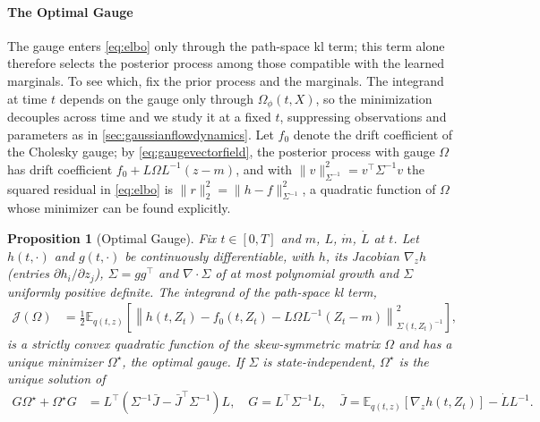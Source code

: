\documentclass{article} %
\newcommand{\priordrift}{h}
\newcommand{\postdrift}{f}
\newcommand{\vol}{g}
\newcommand{\obs}{X}
\newcommand{\gauge}{\Omega}
\newcommand{\E}{\mathbb{E}}
\newtheorem{proposition}[theorem]{Proposition}
\begin{document}
\paragraph{The Optimal Gauge}
The gauge enters \cref{eq:elbo} only through the path-space \gls{kl} term; this term alone therefore selects the posterior process among those compatible with the learned marginals. To see which, fix the prior process and the marginals. The integrand at time $t$ depends on the gauge only through $\gauge_\phi(t, \obs)$, so the minimization decouples across time and we study it at a fixed $t$, suppressing observations and parameters as in \cref{sec:gaussianflowdynamics}. Let $\postdrift_0$ denote the drift coefficient of the Cholesky gauge; by \cref{eq:gaugevectorfield}, the posterior process with gauge $\gauge$ has drift coefficient $\postdrift_0 + L \gauge L^{-1}(z - m)$, and with $\| v \|_{\Sigma^{-1}}^2 = v^\top \Sigma^{-1} v$ the squared residual in \cref{eq:elbo} is $\| r \|_2^2 = \| \priordrift - \postdrift \|_{\Sigma^{-1}}^2$, a quadratic function of $\gauge$ whose minimizer can be found explicitly.
\begin{proposition}[Optimal Gauge]
\label{prop:optimalgauge}
Fix $t \in [0, T]$ and $m$, $L$, $\dot m$, $\dot L$ at $t$. Let $\priordrift(t, \cdot)$ and $\vol(t, \cdot)$ be continuously differentiable, with $\priordrift$, its Jacobian $\nabla_z \priordrift$ (entries $\partial \priordrift_i / \partial z_j$), $\Sigma = \vol \vol^\top$ and $\nabla \cdot \Sigma$ of at most polynomial growth and $\Sigma$ uniformly positive definite. The integrand of the path-space \gls{kl} term,
\begin{align}
    \mathcal{J}(\gauge) &= \frac{1}{2} \E_{q(t, z)} \left[ \left\| \priordrift(t, Z_t) - \postdrift_0(t, Z_t) - L \gauge L^{-1}(Z_t - m) \right\|_{\Sigma(t, Z_t)^{-1}}^2 \right], \label{eq:Jgauge}
\end{align}
is a strictly convex quadratic function of the skew-symmetric matrix $\gauge$ and has a unique minimizer $\gauge^\star$, the \emph{optimal gauge}. If $\Sigma$ is state-independent, $\gauge^\star$ is the unique solution of
\begin{align}
    G \gauge^\star + \gauge^\star G &= L^\top \left( \Sigma^{-1} \bar J - \bar J^\top \Sigma^{-1} \right) L, \quad G = L^\top \Sigma^{-1} L, \quad \bar J = \E_{q(t, z)} \left[ \nabla_z \priordrift(t, Z_t) \right] - \dot L L^{-1}.
    \label{eq:optimalgauge}
\end{align}
\end{proposition}
\end{document}
